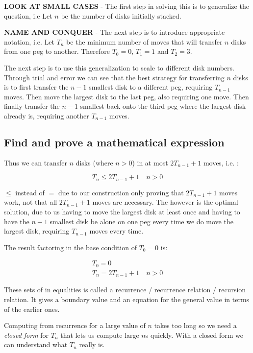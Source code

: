 \documentclass[12pt letter]{report}
\begin{document}
\textbf{LOOK AT SMALL CASES} - The first step in solving this is to generalize the question, i.e Let $n$ be the number of disks initially stacked.

\textbf{NAME AND CONQUER} - The next step is to introduce appropriate notation, i.e. Let $T_n$ be the minimum number of moves that will transfer $n$
disks from one peg to another. Therefore $T_0 = 0$, $T_1= 1$ and $T_2 = 3$.

The next step is to use this generalization to scale to different disk numbers. Through trial and error we can see that
the best strategy for transferring $n$ disks is to first transfer the $n - 1$ smallest disk to a different peg, requiring
$T_{n-1}$ moves. Then move the largest disk to the last peg, also requiring one move. Then finally transfer the $n-1$
smallest back onto the third peg where the largest disk already is, requiring another $T_{n-1}$ moves.

\subsection{Find and prove a mathematical expression}\label{expression}

Thus we can transfer $n$ disks (where $n > 0$) in at most $2T_{n-1} + 1$ moves, i.e. :

\[
  T_n \leq 2T_{n-1} + 1 \quad n > 0
\]

$\leq$ instead of $=$ due to our construction only proving that $2T_{n-1} + 1$ moves work, not that all $2T_{n-1} + 1$
moves are necessary. The however is the optimal solution, due to us having to move the largest disk at least once and
having to have the $n-1$ smallest disk be alone on one peg every time we do move the largest disk, requiring $T_{n-1}$
moves every time.

The result factoring in the base condition of $T_0 = 0$ is:

\begin{gather*}
  T_0 = 0\\
  T_n = 2T_{n-1} + 1 \quad n > 0
\end{gather*}

These sets of in equalities is called a recurrence / recurrence relation / recursion relation. It gives a boundary value
and an equation for the general value in terms of the earlier ones.

Computing from recurrence for a large value of $n$ takes too long so we need a \textit{closed form} for $T_n$ that lets
us compute large $n$s quickly. With a closed form we can understand what $T_n$ really is.
\end{document}
